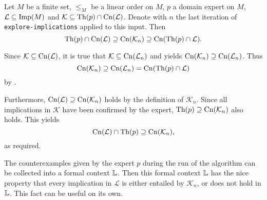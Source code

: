 \begin{Theorem}
  \label{thm:explore-implications-correctness}
  Let $M$ be a finite set, $\leq_{M}$ be a linear order on $M$, $p$ a domain expert on
  $M$, $\mathcal{L} \subseteq \operatorname{Imp}(M)$ and $\mathcal{K} \subseteq \operatorname{Th}(p) \cap
  \operatorname{Cn}(\mathcal{L})$.  Denote with $n$ the last iteration of
  \lstinline{explore-implications} applied to this input.  Then
  \begin{equation*}
    \operatorname{Th}(p) \cap \operatorname{Cn}(\mathcal{L}) \supseteq \operatorname{Cn}(\mathcal{K}_{n}) \supseteq \operatorname{Cn}(\operatorname{Th}(p) \cap \mathcal{L}).
  \end{equation*}
\end{Theorem}
\begin{Proof}
  Since $\mathcal{K} \subseteq \operatorname{Cn}(\mathcal{L})$, it is true that $\mathcal{K} \subseteq
  \operatorname{Cn}(\mathcal{L}_{n})$ and  yields
  $\operatorname{Cn}(\mathcal{K}_{n}) \supseteq \operatorname{Cn}(\mathcal{L}_{n})$.  Thus
  \begin{equation*}
    \operatorname{Cn}(\mathcal{K}_{n}) \supseteq \operatorname{Cn}(\mathcal{L}_{n}) = \operatorname{Cn}(\operatorname{Th}(p) \cap \mathcal{L})
  \end{equation*}
  by .

  Furthermore, $\operatorname{Cn}(\mathcal{L}) \supseteq \operatorname{Cn}(\mathcal{K}_{n})$ holds by the definition
  of $\mathcal{K}_{n}$.  Since all implications in $\mathcal{K}$ have been confirmed by
  the expert, $\operatorname{Th}(p) \supseteq \operatorname{Cn}(\mathcal{K}_{n})$ also holds.  This yields
  \begin{equation*}
    \operatorname{Cn}(\mathcal{L}) \cap \operatorname{Th}(p) \supseteq \operatorname{Cn}(\mathcal{K}_{n}),
  \end{equation*}
  as required.
\end{Proof}

The counterexamples given by the expert $p$ during the run of the algorithm can be
collected into a formal context ${\mathbb{L}}$.  Then this formal context ${\mathbb{L}}$ has the nice
property that every implication in $\mathcal{L}$ is either entailed by $\mathcal{K}_{n}$,
or does not hold in ${\mathbb{L}}$.  This fact can be useful on its own.

